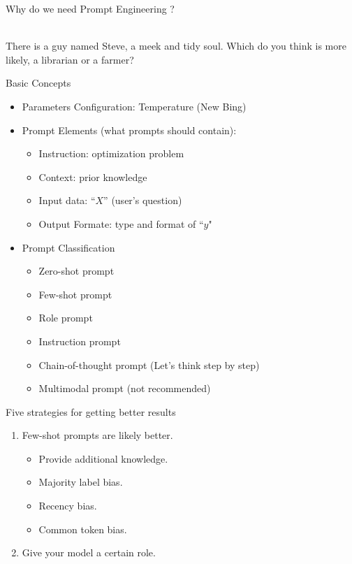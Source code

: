 \documentclass[UTF8, 16pt]{beamer}
\begin{document}
\begin{CJK*}{UTF8}{gbsn}
\begin{frame}{Why do we need Prompt Engineering ?}
\begin{itemize}
\begin{itemize}
					\\
					There is a guy named Steve, a meek and tidy soul. Which do you think is more likely, a librarian or a farmer?
			\end{itemize}
	\end{itemize}
\end{frame}
\begin{frame}{Basic Concepts}
	\begin{itemize}
		\item Parameters Configuration: \alert{Temperature} (New Bing)
		\item Prompt Elements (what prompts should contain):
			\begin{itemize}
				\item \alert{Instruction}: optimization problem
				\item \alert{Context}: prior knowledge
				\item \alert{Input data}: ``$X$'' (user's question)
				\item \alert{Output Formate}: type and format of ``$y$"
			\end{itemize}
		\item Prompt Classification
			\begin{itemize}
				\item Zero-shot prompt
				\item \alert{Few-shot prompt}
				\item \alert{Role prompt}
				\item \alert{Instruction prompt}
				\item \alert{Chain-of-thought prompt} (Let's think step by step)            
				\item Multimodal prompt (not recommended)
			\end{itemize}
	\end{itemize}
\end{frame}
\begin{frame}{Five strategies for getting better results}
	\begin{enumerate}
		\item \alert{Few-shot prompts} are likely better.
			\begin{itemize}
				\item Provide additional knowledge.
				\item Majority label bias.
				\item Recency bias.
				\item Common token bias.
			\end{itemize}
		\item Give your model a certain \alert{role}.

\end{enumerate}
\end{frame}
\end{CJK*}
\end{document}
